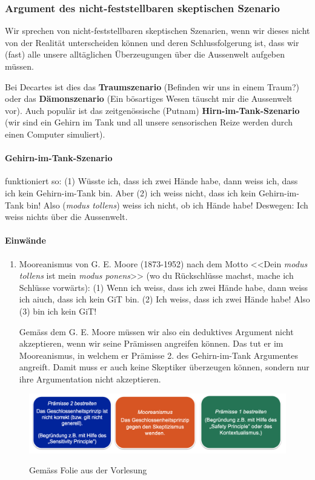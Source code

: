 \documentclass[../main.tex]{subfiles}
\begin{document}
\subsubsection{Argument des nicht-feststellbaren skeptischen Szenario}
Wir sprechen von nicht-feststellbaren skeptischen Szenarien, wenn wir dieses nicht von der Realität unterscheiden können und deren Schlussfolgerung ist, dass wir (fast) alle unsere alltäglichen Überzeugungen über die Aussenwelt aufgeben müssen. 

Bei Decartes ist dies das \textbf{Traumszenario} (Befinden wir uns in einem Traum?) oder das \textbf{Dämonszenario} (Ein bösartiges Wesen täuscht mir die Aussenwelt vor). Auch populär ist das zeitgenössische (Putnam) \textbf{Hirn-im-Tank-Szenario} (wir sind ein Gehirn im Tank und all unsere sensorischen Reize werden durch einen Computer simuliert).

\paragraph{Gehirn-im-Tank-Szenario} funktioniert so: (1) Wüsste ich, dass ich zwei Hände habe, dann weiss ich, dass ich kein Gehirn-im-Tank bin. Aber (2) ich weiss nicht, dass ich kein Gehirn-im-Tank bin! Also (\textit{modus tollens}) weiss ich nicht, ob ich Hände habe! Deswegen: Ich weiss nichts über die Aussenwelt.

\paragraph{Einwände}
\begin{enumerate}
	\item Mooreanismus von G. E. Moore (1873-1952) nach dem Motto <<Dein \textit{modus tollens} ist mein \textit{modus ponens}>> (wo du Rückschlüsse machst, mache ich Schlüsse vorwärts): (1) Wenn ich weiss, dass ich zwei Hände habe, dann weiss ich aiuch, dass ich kein GiT bin. (2) Ich weiss, dass ich zwei Hände habe! Also (3) bin ich kein GiT!

		Gemäss dem G. E. Moore müssen wir also ein deduktives Argument nicht akzeptieren, wenn wir seine Prämissen angreifen können. Das tut er im Mooreanismus, in welchem er Prämisse 2. des Gehirn-im-Tank Argumentes angreift. Damit muss er auch keine Skeptiker überzeugen können, sondern nur ihre Argumentation nicht akzeptieren. 
\end{enumerate}

\vspace{10pt}
\begin{figure}[!htb]
\centering
{\centering\includegraphics[width=\textwidth]{images/loesungsansaetze_gehirn_im_tank.png}\endcenter}
\caption{Gemäss Folie aus der Vorlesung}
\end{figure}
\end{document}
